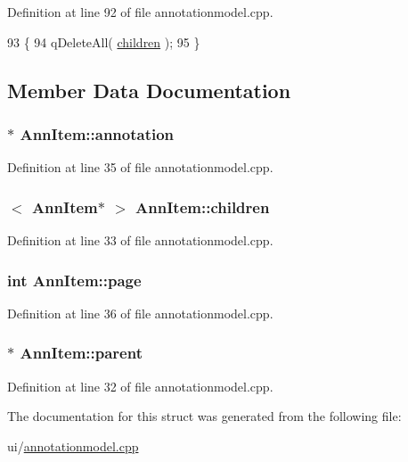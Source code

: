 Definition at line 92 of file annotationmodel.\+cpp.


\begin{DoxyCode}
93 \{
94     qDeleteAll( \hyperlink{structAnnItem_a11048051ad0be5a2c8607a9334e006a1}{children} );
95 \}
\end{DoxyCode}


\subsection{Member Data Documentation}
\hypertarget{structAnnItem_a72999b1a45d966e6f622dee4d958790f}{
\subsubsection[{annotation}]{$\ast$ Ann\+Item\+::annotation}}\label{structAnnItem_a72999b1a45d966e6f622dee4d958790f}


Definition at line 35 of file annotationmodel.\+cpp.

\hypertarget{structAnnItem_a11048051ad0be5a2c8607a9334e006a1}{
\subsubsection[{children}]{$<$ {\bf Ann\+Item}$\ast$ $>$ Ann\+Item\+::children}}\label{structAnnItem_a11048051ad0be5a2c8607a9334e006a1}


Definition at line 33 of file annotationmodel.\+cpp.

\hypertarget{structAnnItem_ad2bc09dd1499fd52205eb02c3bf67830}{
\subsubsection[{page}]{\setlength{\rightskip}{0pt plus 5cm}int Ann\+Item\+::page}}\label{structAnnItem_ad2bc09dd1499fd52205eb02c3bf67830}


Definition at line 36 of file annotationmodel.\+cpp.

\hypertarget{structAnnItem_aece74b70cc6acc8ebb751256386f9be8}{
\subsubsection[{parent}]{$\ast$ Ann\+Item\+::parent}}\label{structAnnItem_aece74b70cc6acc8ebb751256386f9be8}


Definition at line 32 of file annotationmodel.\+cpp.



The documentation for this struct was generated from the following file\+:\begin{DoxyCompactItemize}
\item 
ui/\hyperlink{annotationmodel_8cpp}{annotationmodel.\+cpp}\end{DoxyCompactItemize}
